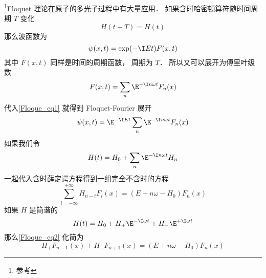 

\footnote{参考\cite{Brandsen}}Floquet 理论在原子的多光子过程中有大量应用． 如果含时哈密顿算符随时间周期 $T$ 变化
\begin{equation}
H(t+T) = H(t)
\end{equation}
那么波函数为
\begin{equation}\label{Floque_eq1}
\psi(x, t) = \exp(-\I Et) F(x, t)
\end{equation}
其中 $F(x, t)$ 同样是时间的周期函数， 周期为 $T$． 所以又可以展开为傅里叶级数
\begin{equation}
F(x, t) = \sum_{n} \E^{-\I n\omega t} F_n(x)
\end{equation}
代入\autoref{Floque_eq1} 就得到 Floquet-Fourier 展开
\begin{equation}
\psi(x, t) = \E^{-\I Et} \sum_{n} \E^{-\I n\omega t} F_n(x)
\end{equation}
如果我们令
\begin{equation}
H(t) = H_0 + \sum_{n} \E^{-\I n\omega t} H_n
\end{equation}
一起代入含时薛定谔方程得到一组完全不含时的方程
\begin{equation}\label{Floque_eq2}
\sum_{i=-\infty}^{+\infty} H_{n-i} F_i(x) = (E + n\omega - H_0) F_n(x)
\end{equation}
如果 $H$ 是简谐的
\begin{equation}
H(t) = H_0 + H_+\E^{-\I\omega t} + H_-\E^{+\I\omega t}
\end{equation}
那么\autoref{Floque_eq2} 化简为
\begin{equation}
H_{+} F_{n-1}(x) + H_{-} F_{n+1}(x) = (E + n\omega - H_0) F_n(x)
\end{equation}
